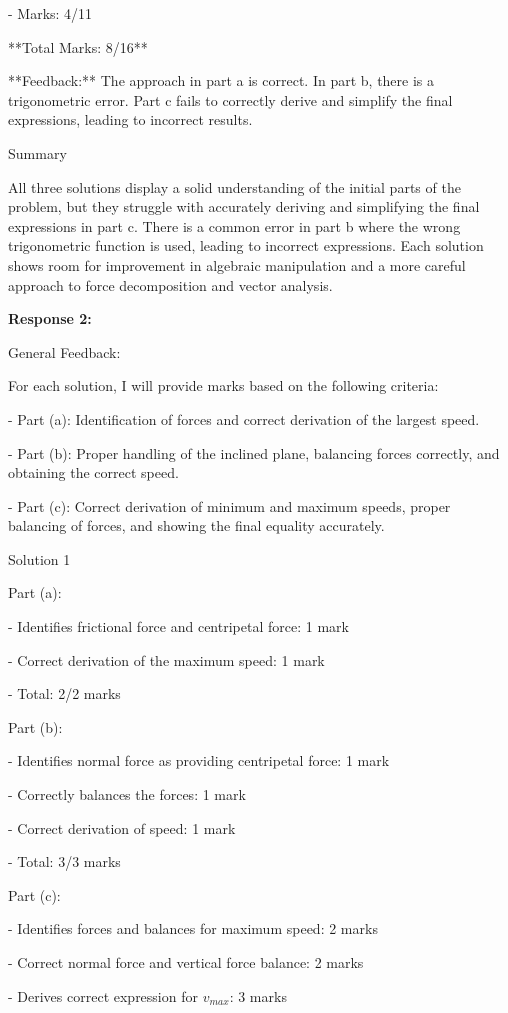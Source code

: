 \documentclass[a4paper,11pt]{article}
\begin{document}
- Marks: 4/11

**Total Marks: 8/16**

**Feedback:** The approach in part a is correct. In part b, there is a trigonometric error. Part c fails to correctly derive and simplify the final expressions, leading to incorrect results.

Summary

All three solutions display a solid understanding of the initial parts of the problem, but they struggle with accurately deriving and simplifying the final expressions in part c. There is a common error in part b where the wrong trigonometric function is used, leading to incorrect expressions. Each solution shows room for improvement in algebraic manipulation and a more careful approach to force decomposition and vector analysis.

\bigskip
\textbf{Response 2:}

General Feedback:

For each solution, I will provide marks based on the following criteria:

- Part (a): Identification of forces and correct derivation of the largest speed.

- Part (b): Proper handling of the inclined plane, balancing forces correctly, and obtaining the correct speed.

- Part (c): Correct derivation of minimum and maximum speeds, proper balancing of forces, and showing the final equality accurately.

Solution 1

Part (a): 

- Identifies frictional force and centripetal force: 1 mark

- Correct derivation of the maximum speed: 1 mark

- Total: 2/2 marks

Part (b): 

- Identifies normal force as providing centripetal force: 1 mark

- Correctly balances the forces: 1 mark

- Correct derivation of speed: 1 mark

- Total: 3/3 marks

Part (c): 

- Identifies forces and balances for maximum speed: 2 marks

- Correct normal force and vertical force balance: 2 marks

- Derives correct expression for \( v_{max} \): 3 marks
\end{document}
